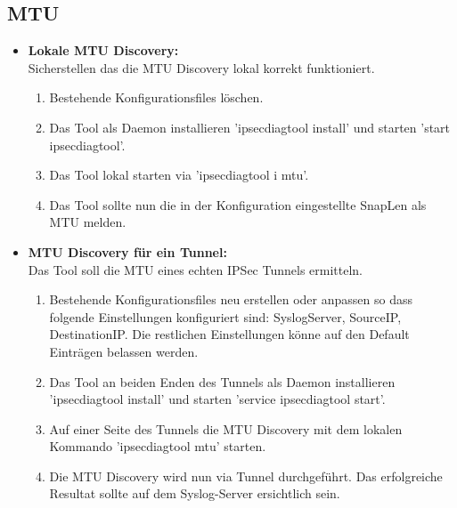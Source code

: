 \subsection{MTU}
\begin{itemize}
\item[\Square] \textbf{Lokale MTU Discovery:}\\
Sicherstellen das die MTU Discovery lokal korrekt funktioniert.
\begin{enumerate} \itemsep1pt \parskip0pt 
  \item Bestehende Konfigurationsfiles löschen.  
  \item Das Tool als Daemon installieren 'ipsecdiagtool install' und starten 'start ipsecdiagtool'.
  \item Das Tool lokal starten via 'ipsecdiagtool i mtu'.
  \item Das Tool sollte nun die in der Konfiguration eingestellte SnapLen als MTU melden.
\end{enumerate}
			   
\item[\Square] \textbf{MTU Discovery für ein Tunnel:}\\
Das Tool soll die MTU eines echten IPSec Tunnels ermitteln.
\begin{enumerate} \itemsep1pt \parskip0pt 
  \item Bestehende Konfigurationsfiles neu erstellen oder anpassen so dass folgende Einstellungen konfiguriert sind: SyslogServer, SourceIP, DestinationIP. Die restlichen Einstellungen könne auf den Default Einträgen belassen werden.
  \item Das Tool an beiden Enden des Tunnels als Daemon installieren 'ipsecdiagtool install' und starten 'service ipsecdiagtool start'.
  \item Auf einer Seite des Tunnels die MTU Discovery mit dem lokalen Kommando 'ipsecdiagtool mtu' starten.
  \item Die MTU Discovery wird nun via Tunnel durchgeführt. Das erfolgreiche Resultat sollte auf dem Syslog-Server ersichtlich sein.
\end{enumerate}


\end{itemize}
